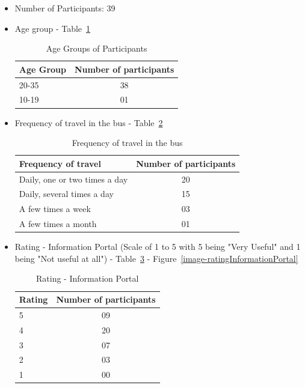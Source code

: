 \begin {itemize}

\item Number of Participants: 39

\item Age group - Table~\ref{table-survey-ageGroupOfSurveyParticipants}

\begin{table} [H]
\centering
\begin{tabular}{|l|c|}
\hline
Age Group & Number of participants \\
\hline
20-35	&38 \\
10-19	&01 \\
\hline
\end{tabular}
\caption{Age Groups of Participants}
\label{table-survey-ageGroupOfSurveyParticipants}
\end{table}

\item Frequency of travel in the bus - Table~\ref{table-survey-frequencyOfTravelInTheBus}

\begin{table} [H]
\centering
\begin{tabular}{|l|c|}
\hline
Frequency of travel & Number of participants \\
\hline
Daily, one or two times a day	&20 \\
Daily, several times a day	&15 \\
A few times a week	&03 \\
A few times a month	&01 \\
\hline
\end{tabular}
\caption{Frequency of travel in the bus}
\label{table-survey-frequencyOfTravelInTheBus}
\end{table}



\item Rating - Information Portal (Scale of 1 to 5 with 5 being "Very Useful" and 1 being "Not useful at all") - Table~\ref{table-survey-rating-InformationPortal} - Figure~\ref{image-ratingInformationPortal}

\begin{table} [H]
\centering
\begin{tabular}{|l|c|}
\hline
Rating & Number of participants \\
\hline
5	&09 \\
4	&20 \\
3	&07 \\
2	&03 \\
1	&00 \\
\hline
\end{tabular}
\caption{Rating - Information Portal}
\label{table-survey-rating-InformationPortal}
\end{table}


\end{itemize}

